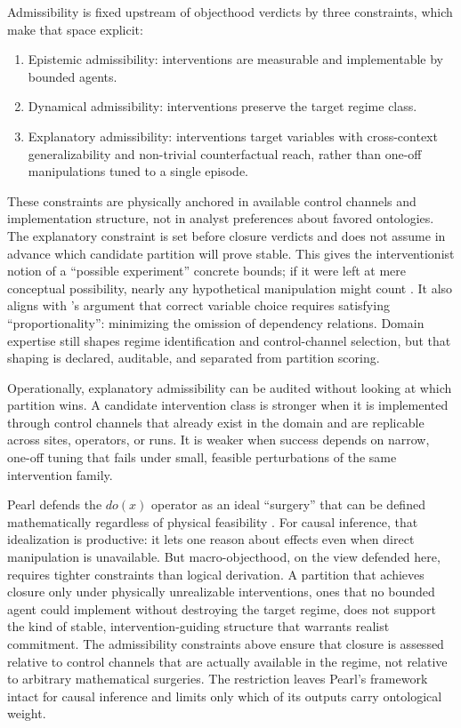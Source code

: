 Admissibility is fixed upstream of objecthood verdicts by three
constraints, which make that space explicit:

\begin{enumerate}
	\item
	      Epistemic admissibility: interventions are measurable and
	      implementable by bounded agents.
	\item
	      Dynamical admissibility: interventions preserve the target regime
	      class.
	\item
	      Explanatory admissibility: interventions target variables with
	      cross-context generalizability and non-trivial counterfactual reach,
	      rather than one-off manipulations tuned to a single episode.
\end{enumerate}

These constraints are physically anchored in available control channels
and implementation structure, not in analyst preferences about
favored ontologies. The explanatory constraint is set before closure
verdicts and does not assume in advance which candidate partition will
prove stable. This gives the interventionist notion of a ``possible
experiment'' concrete bounds; if it were left at mere conceptual
possibility, nearly any hypothetical manipulation might count
\citep{woodward2015}. It also aligns with \citet{woodward2021}'s argument
that correct variable choice requires satisfying
``proportionality'': minimizing the omission of dependency relations.
Domain expertise still shapes regime identification and
control-channel selection, but that shaping is declared, auditable, and
separated from partition scoring.

Operationally, explanatory admissibility can be audited without looking
at which partition wins. A candidate intervention class is stronger when
it is implemented through control channels that already exist in the
domain and are replicable across sites, operators, or runs. It is weaker
when success depends on narrow, one-off tuning that fails under small,
feasible perturbations of the same intervention family.

Pearl defends the $do(x)$ operator
as an ideal ``surgery'' that can be defined mathematically regardless of
physical feasibility \citep{pearl2000}. For causal inference, that
idealization is productive: it lets one reason about effects even when
direct manipulation is unavailable. But macro-objecthood, on the view
defended here, requires tighter constraints than logical derivation. A partition that achieves
closure only under physically unrealizable interventions, ones that no
bounded agent could implement without destroying the target regime, does
not support the kind of stable, intervention-guiding structure that
warrants realist commitment. The admissibility constraints above ensure
that closure is assessed relative to control channels that are actually
available in the regime, not relative to arbitrary mathematical
surgeries. The restriction leaves Pearl's framework intact for causal
inference and limits only which of its outputs carry ontological weight.


